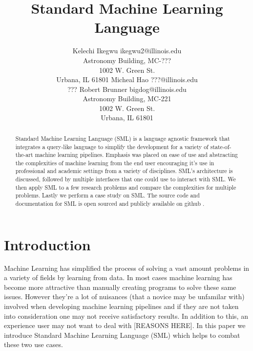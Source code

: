 \documentclass[jair,twoside,11pt,theapa]{article}
\begin{document}
\title{Standard Machine Learning Language}

\author{\name Kelechi Ikegwu \email ikegwu2@illinois.edu \\
        Astronomy Building, MC-??? \\1002 W. Green St.\\ Urbana, IL  61801
       \AND
       \name Micheal Hao  \email ???@illinois.edu \\
       \addr ???
       \AND
       \name Robert Brunner \email bigdog@illinois.edu\\
        Astronomy Building, MC-221 \\1002 W. Green St.\\ Urbana, IL  61801}


\maketitle


\begin{abstract}
Standard Machine Learning Language (SML) is a language agnostic framework that integrates a query-like language to simplify the development for a variety of state-of-the-art machine learning pipelines. Emphasis was placed on ease of use and abstracting the complexities of machine learning from the end user encouraging it's use in professional and academic settings from a variety of disciplines. SML's architecture is discussed, followed by multiple interfaces that one could use to interact with SML. We then apply SML to a few research problems and compare the complexities for multiple problems. Lastly we perform a case study on SML. The source code and documentation for SML is open sourced and publicly available on github \cite{ginsberg}.
\end{abstract}

\section{Introduction}
\label{Introduction}

Machine Learning has simplified the process of solving a vast amount problems in a variety of fields by learning from data. In most cases machine learning has become more attractive than manually creating programs to solve these same issues. However they're a lot of nuisances (that a novice may be unfamilar with) involved when developing machine learning pipelines \cite{pedros:fewUsefulThings} and if they are not taken into consideration one may not receive satisfactory results. In addition to this, an experience user may not want to deal with [REASONS HERE]. In this paper we introduce Standard Machine Learning Language (SML)  which helps to combat these two use cases.
\end{document}
